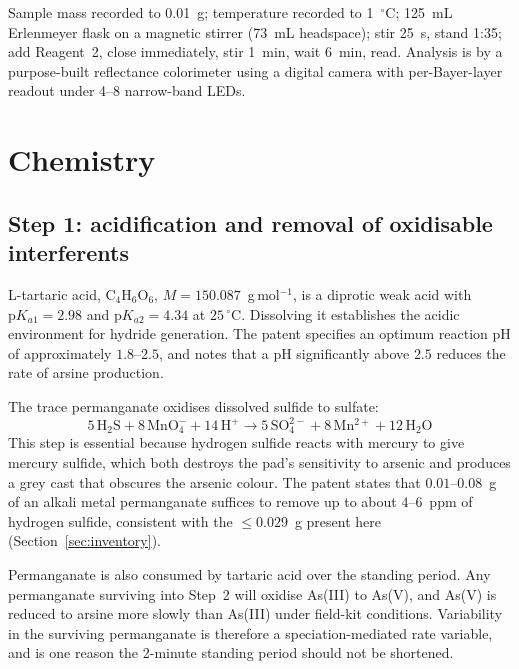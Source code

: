 \documentclass[11pt,a4paper]{article}
\begin{document}
Sample mass recorded to 0.01~g; temperature recorded to 1~$^\circ$C;
125~mL Erlenmeyer flask on a magnetic stirrer (73~mL headspace); stir 25~s,
stand 1:35; add Reagent~2, close immediately, stir 1~min, wait 6~min, read.
Analysis is by a purpose-built reflectance colorimeter using a digital
camera with per-Bayer-layer readout under 4--8 narrow-band LEDs.

\section{Chemistry}

\subsection{Step 1: acidification and removal of oxidisable interferents}

L-tartaric acid, $\mathrm{C_4H_6O_6}$, $M = 150.087$~g\,mol$^{-1}$, is a
diprotic weak acid with $\mathrm{p}K_{a1} = 2.98$ and
$\mathrm{p}K_{a2} = 4.34$ at $25\,^\circ$C. Dissolving it establishes the
acidic environment for hydride generation. The patent specifies an optimum
reaction pH of approximately $1.8$--$2.5$, and notes that a pH significantly
above $2.5$ reduces the rate of arsine production.

The trace permanganate oxidises dissolved sulfide to sulfate:
\begin{equation}
  5\,\mathrm{H_2S} + 8\,\mathrm{MnO_4^-} + 14\,\mathrm{H^+}
  \longrightarrow 5\,\mathrm{SO_4^{2-}} + 8\,\mathrm{Mn^{2+}}
  + 12\,\mathrm{H_2O}
\end{equation}
This step is essential because hydrogen sulfide reacts with mercury to give
mercury sulfide, which both destroys the pad's sensitivity to arsenic and
produces a grey cast that obscures the arsenic colour. The patent states
that $0.01$--$0.08$~g of an alkali metal permanganate suffices to remove up
to about $4$--$6$~ppm of hydrogen sulfide, consistent with the
$\leq 0.029$~g present here (Section~\ref{sec:inventory}).

Permanganate is also consumed by tartaric acid over the standing period.
Any permanganate surviving into Step~2 will oxidise As(III) to As(V), and
As(V) is reduced to arsine more slowly than As(III) under field-kit
conditions. Variability in the surviving permanganate is therefore a
speciation-mediated rate variable, and is one reason the 2-minute standing
period should not be shortened.
\end{document}
